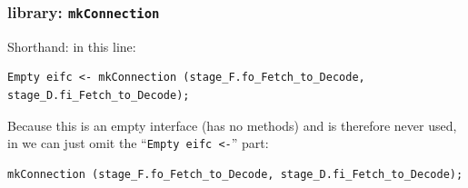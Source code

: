 
\begin{frame}[fragile]
\frametitle{{\BSV} library: {\tt mkConnection}}

\footnotesize

Shorthand: in this line:

\vspace{1ex}

\begin{Verbatim}[frame=single]
   Empty eifc <- mkConnection (stage_F.fo_Fetch_to_Decode, stage_D.fi_Fetch_to_Decode);
\end{Verbatim}

\vspace{1ex}

Because this is an empty interface (has no methods) and is therefore
never used, in {\BSV} we can just omit the ``{\tt Empty eifc <-}''
part:

\vspace{1ex}

\begin{Verbatim}[frame=single]
   mkConnection (stage_F.fo_Fetch_to_Decode, stage_D.fi_Fetch_to_Decode);
\end{Verbatim}

\end{frame}






